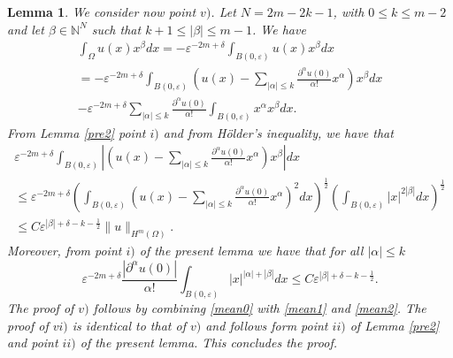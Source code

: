 \documentclass[11pt,a4paper]{amsart}
\numberwithin{equation}{section}
\newtheorem{lemma}[equation]{Lemma}
\begin{document}
\begin{lemma}
We consider now point $v)$. Let $N=2m-2k-1$, with $0\leq k\leq m-2$ and let $\beta\in\mathbb N^N$ such that $k+1\leq|\beta|\leq m-1$. We have
\begin{multline}\label{mean0}
\int_{\Omega}u(x)x^{\beta}dx=-\varepsilon^{-2m+\delta}\int_{B(0,\varepsilon)}u(x)x^{\beta}dx\\
=-\varepsilon^{-2m+\delta}\int_{B(0,\varepsilon)}\left(u(x)-\sum_{|\alpha|\leq k}\frac{\partial^{\alpha}u(0)}{\alpha !}x^{\alpha}\right)x^{\beta}dx\\
-\varepsilon^{-2m+\delta}\sum_{|\alpha|\leq k}\frac{\partial^{\alpha}u(0)}{\alpha !}\int_{B(0,\varepsilon)}x^{\alpha}x^{\beta}dx.
\end{multline}
From Lemma \ref{pre2} point $i)$ and from H\"older's inequality, we have that
\begin{multline}\label{mean1}
\varepsilon^{-2m+\delta}\int_{B(0,\varepsilon)}\left|\left(u(x)-\sum_{|\alpha|\leq k}\frac{\partial^{\alpha}u(0)}{\alpha !}x^{\alpha}\right)x^{\beta}\right|dx\\
\leq \varepsilon^{-2m+\delta}\left(\int_{B(0,\varepsilon)}(u(x)-\sum_{|\alpha|\leq k}\frac{\partial^{\alpha}u(0)}{\alpha !}x^{\alpha})^2dx\right)^{\frac{1}{2}}\left(\int_{B(0,\varepsilon)}|x|^{2|\beta|}dx\right)^{\frac{1}{2}}\\
\leq C\varepsilon^{|\beta|+\delta-k-\frac{1}{2}}\|u\|_{H^m(\Omega)}.
\end{multline}
Moreover, from point $i)$ of the present lemma we have that  for all $|\alpha|\leq k$
\begin{equation}\label{mean2}
\varepsilon^{-2m+\delta}\frac{|\partial^{\alpha}u(0)|}{\alpha !}\int_{B(0,\varepsilon)}|x|^{|\alpha|+|\beta|}dx\leq C\varepsilon^{|\beta|+\delta-k-\frac{1}{2}}.
\end{equation}
The proof of $v)$ follows by combining \eqref{mean0} with \eqref{mean1} and \eqref{mean2}. The proof of $vi)$ is identical to that of $v)$ and follows form point $ii)$ of Lemma \ref{pre2} and point $ii)$ of the present lemma. This concludes the proof.

\endproof
\end{lemma}







{}

\end{document}
